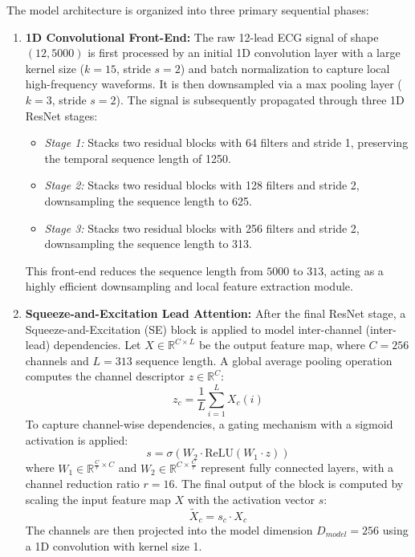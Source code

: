\documentclass[12pt,a4paper]{report}
\begin{document}
The model architecture is organized into three primary sequential phases:
\begin{enumerate}
    \item \textbf{1D Convolutional Front-End:} The raw 12-lead ECG signal of shape $(12, 5000)$ is first processed by an initial 1D convolution layer with a large kernel size ($k=15$, stride $s=2$) and batch normalization to capture local high-frequency waveforms. It is then downsampled via a max pooling layer ($k=3$, stride $s=2$). The signal is subsequently propagated through three 1D ResNet stages:
    \begin{itemize}
        \item \emph{Stage 1:} Stacks two residual blocks with 64 filters and stride 1, preserving the temporal sequence length of 1250.
        \item \emph{Stage 2:} Stacks two residual blocks with 128 filters and stride 2, downsampling the sequence length to 625.
        \item \emph{Stage 3:} Stacks two residual blocks with 256 filters and stride 2, downsampling the sequence length to 313.
    \end{itemize}
    This front-end reduces the sequence length from $5000$ to $313$, acting as a highly efficient downsampling and local feature extraction module.
    
    \item \textbf{Squeeze-and-Excitation Lead Attention:} After the final ResNet stage, a Squeeze-and-Excitation (SE) block is applied to model inter-channel (inter-lead) dependencies. Let $X \in \mathbb{R}^{C \times L}$ be the output feature map, where $C = 256$ channels and $L = 313$ sequence length. A global average pooling operation computes the channel descriptor $z \in \mathbb{R}^C$:
    \begin{equation}
        z_c = \frac{1}{L} \sum_{i=1}^{L} X_c(i)
    \end{equation}
    To capture channel-wise dependencies, a gating mechanism with a sigmoid activation is applied:
    \begin{equation}
        s = \sigma(W_2 \cdot \text{ReLU}(W_1 \cdot z))
    \end{equation}
    where $W_1 \in \mathbb{R}^{\frac{C}{r} \times C}$ and $W_2 \in \mathbb{R}^{C \times \frac{C}{r}}$ represent fully connected layers, with a channel reduction ratio $r = 16$. The final output of the block is computed by scaling the input feature map $X$ with the activation vector $s$:
    \begin{equation}
        \tilde{X}_c = s_c \cdot X_c
    \end{equation}
    The channels are then projected into the model dimension $D_{model} = 256$ using a 1D convolution with kernel size 1.
    

\end{enumerate}
\end{document}
